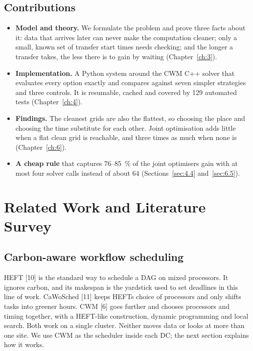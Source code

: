 \documentclass[12pt,a4paper,oneside,openany]{report}
\begin{document}
\section{Contributions}\label{sec:1.5}

\begin{itemize}
\item
  \textbf{Model and theory.} We formulate the problem and prove three
  facts about it: data that arrives later can never make the computation
  cleaner; only a small, known set of transfer start times needs
  checking; and the longer a transfer takes, the less there is to gain
  by waiting (Chapter~\ref{ch:3}).
\item
  \textbf{Implementation.} A Python system around the CWM C++ solver
  that evaluates every option exactly and compares against seven simpler
  strategies and three controls. It is resumable, cached and covered by
  129 automated tests (Chapter~\ref{ch:4}).
\item
  \textbf{Findings.} The cleanest grids are also the flattest, so
  choosing the place and choosing the time substitute for each other.
  Joint optimisation adds little when a flat clean grid is reachable,
  and three times as much when none is (Chapter~\ref{ch:6}).
\item
  \textbf{A cheap rule} that captures 76--85~\% of the joint
  optimiser\textquotesingle s gain with at most four solver calls
  instead of about 64 (Sections~\ref{sec:4.4} and~\ref{sec:6.5}).
\end{itemize}

\chapter{Related Work and Literature Survey}\label{ch:2}

\section{Carbon-aware workflow scheduling}\label{sec:2.1}

HEFT {[}10{]} is the standard way to schedule a DAG on mixed processors.
It ignores carbon, and its makespan is the yardstick used to set
deadlines in this line of work. CaWoSched {[}11{]} keeps
HEFT\textquotesingle s choice of processors and only shifts tasks into
greener hours. CWM {[}6{]} goes further and chooses processors and
timing together, with a HEFT-like construction, dynamic programming and
local search. Both work on a single cluster. Neither moves data or looks
at more than one site. We use CWM as the scheduler inside each DC; the
next section explains how it works.
\end{document}
